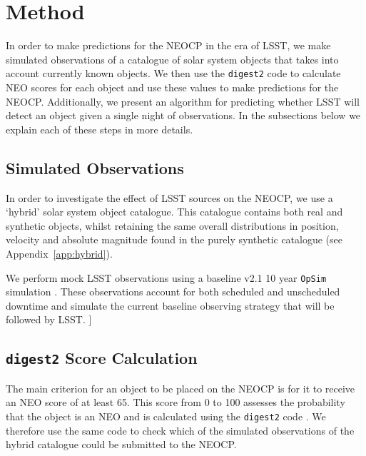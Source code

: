 \documentclass[twocolumn]{aastex631}
\newcommand{\todo}[1]{{\color{red}{[TODO: #1}]}}
\newcommand{\dig}{\texttt{digest2}}
\begin{document}
\section{Method} \label{sec:method}
In order to make predictions for the NEOCP in the era of LSST, we make simulated observations of a catalogue of solar system objects that takes into account currently known objects. We then use the \dig{} code to calculate NEO scores for each object and use these values to make predictions for the NEOCP. Additionally, we present an algorithm for predicting whether LSST will detect an object given a single night of observations. In the subsections below we explain each of these steps in more details.

\subsection{Simulated Observations}

In order to investigate the effect of LSST sources on the NEOCP, we use a `hybrid' solar system object catalogue. This catalogue contains both real and synthetic objects, whilst retaining the same overall distributions in position, velocity and absolute magnitude found in the purely synthetic catalogue (see Appendix~\ref{app:hybrid}).

We perform mock LSST observations using a baseline v2.1 10 year \texttt{OpSim} simulation \citep{opsim, Cornwall+2020}. These observations account for both scheduled and unscheduled downtime and simulate the current baseline observing strategy that will be followed by LSST. \todo{Mario should check this because I don't know what I'm talking about}

\subsection{\dig{} Score Calculation}\label{sec:digest2_score}
The main criterion for an object to be placed on the NEOCP is for it to receive an NEO score of at least 65. This score from 0 to 100 assesses the probability that the object is an NEO and is calculated using the \dig{} code \citep{Keys+2019}. We therefore use the same code to check which of the simulated observations of the hybrid catalogue could be submitted to the NEOCP.
\end{document}
